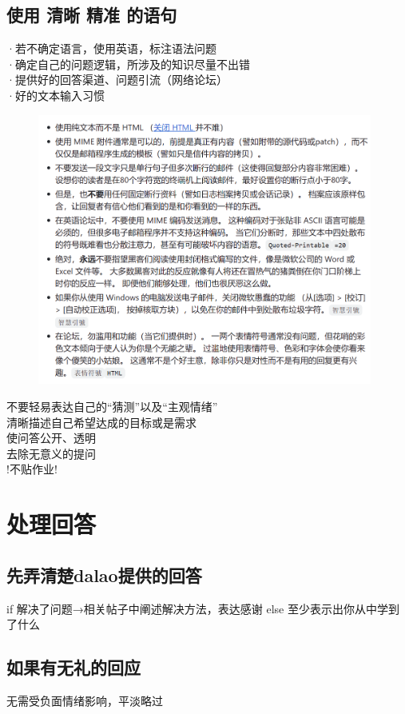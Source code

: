 \documentclass{article}
\begin{document}
\subsection{使用  清晰  精准 的语句}
·若不确定语言，使用英语，标注语法问题\\
·确定自己的问题逻辑，所涉及的知识尽量不出错\\
·提供好的回答渠道、问题引流（网络论坛）\\
·好的文本输入习惯\\
\begin{figure}[h]
    \centering
    \includegraphics[width=11cm]{image5.png}
    \label{fig:enter-label}
\end{figure}

不要轻易表达自己的“猜测”以及“主观情绪”\\
  清晰描述自己希望达成的目标或是需求\\
  使问答公开、透明\\
  去除无意义的提问\\
!不贴作业!

\section{处理回答}
 \subsection{先弄清楚dalao提供的回答} 
      if  解决了问题→相关帖子中阐述解决方法，表达感谢
      else  至少表示出你从中学到了什么
\subsection{如果有无礼的回应}
  无需受负面情绪影响，平淡略过
\end{document}
